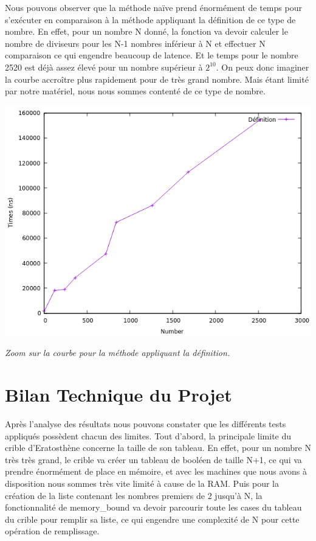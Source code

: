 Nous pouvons observer que la méthode naïve prend énormément de temps pour s'exécuter en comparaison à la méthode appliquant la définition de ce type de nombre. En effet, pour un nombre N donné, la fonction va devoir calculer le nombre de diviseurs pour les N-1 nombres inférieur à N et effectuer N comparaison ce qui engendre beaucoup de latence. Et le temps pour le nombre 2520 est déjà assez élevé  pour un nombre supérieur à $2^{10}$. On peux donc imaginer la courbe accroître plus rapidement pour de très grand nombre. Mais étant limité par notre matériel, nous nous sommes contenté de ce type de nombre.
	\begin{center}\includegraphics[scale=0.5]{HCdef.png}\end{center}
	 \textit{Zoom sur la courbe pour la méthode appliquant la définition.}
	
	\section{Bilan Technique du Projet}	
		Après l'analyse des résultats nous pouvons constater que les différents tests appliqués possèdent chacun des limites.	
		Tout d'abord, la principale limite du crible d'Eratosthène concerne la taille de son tableau. En effet, pour un nombre N très très grand, le crible va créer un tableau de booléen de taille N+1, ce qui va prendre énormément de place en mémoire, et avec les machines que nous avons à disposition nous sommes très vite limité à cause de la RAM. Puis pour la création de la liste contenant les nombres premiers de 2 jusqu'à N, la fonctionnalité de memory\_bound va devoir parcourir toute les cases du tableau du crible pour remplir sa liste, ce qui engendre une complexité de N pour cette opération de remplissage.\\
		
